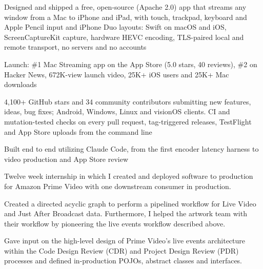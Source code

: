 \documentclass[letterpaper]{deedy-resume} %
\begin{document}
\begin{minipage}[t]{0.66\textwidth}
\begin{tightitemize}
\item Designed and shipped a free, open-source (Apache 2.0) app that streams any window from a Mac to iPhone and iPad, with touch, trackpad, keyboard and Apple Pencil input and iPhone Duo layouts: Swift on macOS and iOS, ScreenCaptureKit capture, hardware HEVC encoding, TLS-paired local and remote transport, no servers and no accounts
\item Launch: \#1 Mac Streaming app on the App Store (5.0 stars, 40 reviews), \#2 on Hacker News, 672K-view launch video, 25K+ iOS users and 25K+ Mac downloads
\item 4,100+ GitHub stars and 34 community contributors submitting new features, ideas, bug fixes; Android, Windows, Linux and visionOS clients. CI and mutation-tested checks on every pull request, tag-triggered releases, TestFlight and App Store uploads from the command line
\item Built end to end utilizing Claude Code, from the first encoder latency harness to video production and App Store review
\end{tightitemize}
\vspace{\topsep}


\begin{tightitemize}
\item Twelve week internship in which I created and deployed software to production for Amazon Prime Video with one downstream consumer in production.
\item Created a directed acyclic graph to perform a pipelined workflow for Live Video and Just After Broadcast data. Furthermore, I helped the artwork team with their workflow by pioneering the live events workflow described above.
\item Gave input on the high-level design of Prime Video's live events architecture within the Code Design Review (CDR) and Project Design Review (PDR) processes and defined in-production POJOs, abstract classes and interfaces.
\end{tightitemize}

\end{minipage} %
\end{document}
